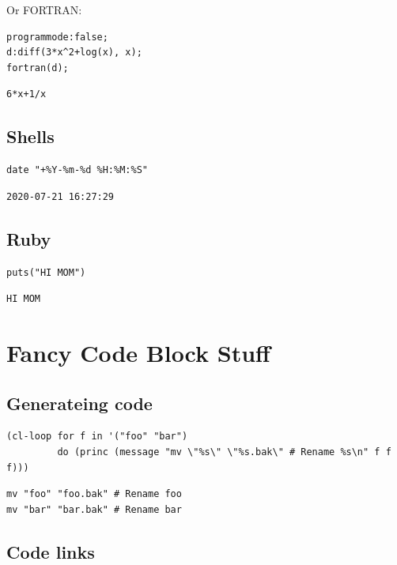 \documentclass[11pt]{article}
\begin{document}
Or FORTRAN:

\begin{verbatim}
programmode:false;
d:diff(3*x^2+log(x), x);
fortran(d);
\end{verbatim}

\begin{verbatim}
6*x+1/x
\end{verbatim}

\subsection{Shells}
\label{sec:org42310c9}

\begin{verbatim}
date "+%Y-%m-%d %H:%M:%S"
\end{verbatim}

\begin{verbatim}
2020-07-21 16:27:29
\end{verbatim}

\subsection{Ruby}
\label{sec:org1abf05f}

\begin{verbatim}
puts("HI MOM")
\end{verbatim}

\begin{verbatim}
HI MOM
\end{verbatim}

\section{Fancy Code Block Stuff}
\label{sec:orgf917570}
\subsection{Generateing code}
\label{sec:org71e0817}

\begin{verbatim}
(cl-loop for f in '("foo" "bar")
         do (princ (message "mv \"%s\" \"%s.bak\" # Rename %s\n" f f f)))
\end{verbatim}

\begin{verbatim}
mv "foo" "foo.bak" # Rename foo
mv "bar" "bar.bak" # Rename bar
\end{verbatim}

\subsection{Code links}
\label{sec:orgefbaea1}
\end{document}

